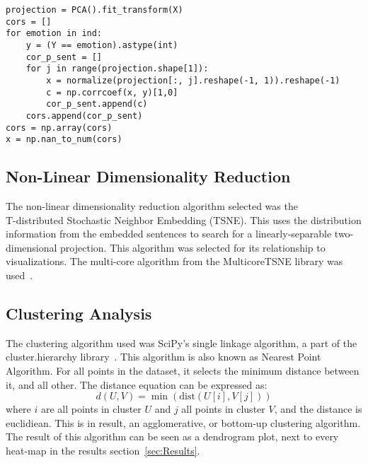 \begin{lstlisting}[caption={PCA correlation Algorithm},label=lst:pca,frame=single]
projection = PCA().fit_transform(X)
cors = []
for emotion in ind:
    y = (Y == emotion).astype(int)
    cor_p_sent = []
    for j in range(projection.shape[1]):
        x = normalize(projection[:, j].reshape(-1, 1)).reshape(-1)
        c = np.corrcoef(x, y)[1,0]
        cor_p_sent.append(c)
    cors.append(cor_p_sent)
cors = np.array(cors)
x = np.nan_to_num(cors)
\end{lstlisting}


\subsection{Non-Linear Dimensionality Reduction}\label{sub:Non-Linear Dimentionality Reduction}
The non-linear dimensionality reduction algorithm selected was the \\ T-distributed Stochastic Neighbor Embedding (TSNE). This uses the distribution information from the embedded sentences to search for a linearly-separable two-dimensional projection. This algorithm was selected for its relationship to visualizations. The multi-core algorithm from the MulticoreTSNE library was used~\cite{ulyanov2016tsne}.


\subsection{Clustering Analysis}\label{sub:Clustering Analysis}
The clustering algorithm used was SciPy's single linkage algorithm, a part of the cluster.hierarchy library~\cite{scipy2020}. This algorithm is also known as Nearest Point Algorithm. For all points in the dataset, it selects the minimum distance between it, and all other. The distance equation can be expressed as:
\begin{equation}
  d(U,V) = \min(\text{dist} (U[i], V[j]))
\end{equation}
where $i$ are all points in cluster $U$ and $j$ all points in cluster $V$, and the distance is euclidiean.
This is in result, an agglomerative, or bottom-up clustering algorithm. The result of this algorithm can be seen as a dendrogram plot, next to every heat-map in the results section~\ref{sec:Results}.
